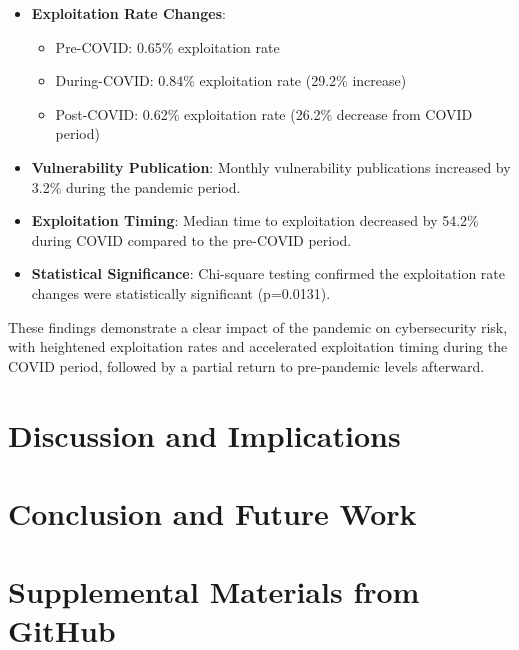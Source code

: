 \documentclass[runningheads]{llncs}
\begin{document}
\begin{itemize}
    \item \textbf{Exploitation Rate Changes}:
    \begin{itemize}
        \item Pre-COVID: 0.65\% exploitation rate
        \item During-COVID: 0.84\% exploitation rate (29.2\% increase)
        \item Post-COVID: 0.62\% exploitation rate (26.2\% decrease from COVID period)
    \end{itemize}
    
    \item \textbf{Vulnerability Publication}: Monthly vulnerability publications increased by 3.2\% during the pandemic period.
    
    \item \textbf{Exploitation Timing}: Median time to exploitation decreased by 54.2\% during COVID compared to the pre-COVID period.
    
    \item \textbf{Statistical Significance}: Chi-square testing confirmed the exploitation rate changes were statistically significant (p=0.0131).
\end{itemize}

These findings demonstrate a clear impact of the pandemic on cybersecurity risk, with heightened exploitation rates and accelerated exploitation timing during the COVID period, followed by a partial return to pre-pandemic levels afterward.



\section{Discussion and Implications}

\section{Conclusion and Future Work}

%
%
%

\section{Supplemental Materials from GitHub}
\label{sec:supplemental_materials}
\end{document}
